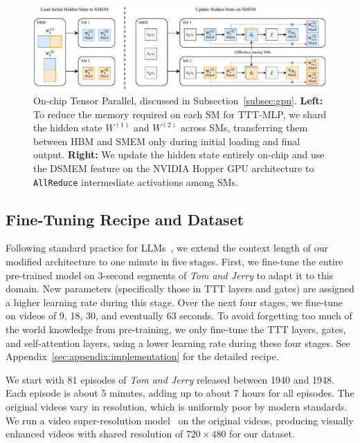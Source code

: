 \begin{figure}[t!]
    \centering
    \includegraphics[width=\textwidth]{figs/systems.pdf}
    \caption{On-chip Tensor Parallel, discussed in Subsection~\ref{subsec:gpu}.
    \textbf{Left:} To reduce the memory required on each SM for TTT-MLP, we shard the hidden state $W^{(1)}$ and $W^{(2)}$ across SMs, transferring them between HBM and SMEM only during initial loading and final output.
    \textbf{Right:} We update the hidden state entirely on-chip and use the DSMEM feature on the NVIDIA Hopper GPU architecture to \texttt{AllReduce} intermediate activations among SMs.
    }
    \label{fig:sys}
\end{figure}

\subsection{Fine-Tuning Recipe and Dataset}
\label{subsec:dataset}

Following standard practice for LLMs~\cite{xiong2023effective}, we extend the context length of our modified architecture to one minute in five stages.
First, we fine-tune the entire pre-trained model on 3-second segments of \textit{Tom and Jerry} to adapt it to this domain.
New parameters (specifically those in TTT layers and gates) are assigned a higher learning rate during this stage.
Over the next four stages, we fine-tune on videos of 9, 18, 30, and eventually 63 seconds.
To avoid forgetting too much of the world knowledge from pre-training,
we only fine-tune the TTT layers, gates, and self-attention layers, using a lower learning rate during these four stages. 
See Appendix~\ref{sec:appendix:implementation} for the detailed recipe.

We start with 81 episodes of \textit{Tom and Jerry} released between 1940 and 1948.
Each episode is about 5 minutes, adding up to about 7 hours for all episodes.
The original videos vary in resolution, which is uniformly poor by modern standards.
We run a video super-resolution model~\cite{wang2021realesrgan} on the original videos, producing visually enhanced videos with shared resolution of $720\times480$ for our dataset.


